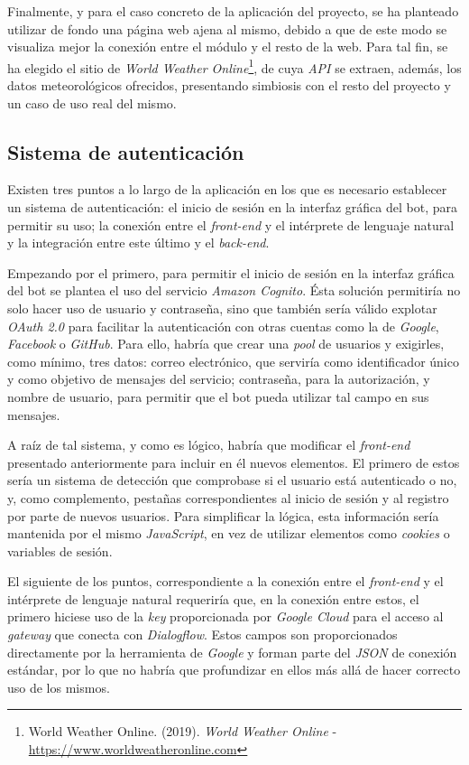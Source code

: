 \documentclass[11pt,spanish,listoffigures]{tfgetsinf}
\begin{document}
Finalmente, y para el caso concreto de la aplicación del proyecto, se ha planteado utilizar de fondo una página web ajena al mismo, debido a que de este modo se visualiza mejor la conexión entre el módulo y el resto de la web. Para tal fin, se ha elegido el sitio de \textit{World Weather Online}\footnote{World Weather Online. (2019). \textit{World Weather Online} - \url{https://www.worldweatheronline.com}}, de cuya \textit{API} se extraen, además, los datos meteorológicos ofrecidos, presentando simbiosis con el resto del proyecto y un caso de uso real del mismo.

\subsection{Sistema de autenticación}
\label{subsec:design-sistema-de-auth}

Existen tres puntos a lo largo de la aplicación en los que es necesario establecer un sistema de autenticación: el inicio de sesión en la interfaz gráfica del bot, para permitir su uso;  la conexión entre el \textit{front-end} y el intérprete de lenguaje natural y la integración entre este último y el \textit{back-end}.

Empezando por el primero, para permitir el inicio de sesión en la interfaz gráfica del bot se plantea el uso del servicio \textit{Amazon Cognito}. Ésta solución permitiría no solo hacer uso de usuario y contraseña, sino que también sería válido explotar \textit{OAuth 2.0} para facilitar la autenticación con otras cuentas como la de \textit{Google}, \textit{Facebook} o \textit{GitHub}. Para ello, habría que crear una \textit{pool} de usuarios y exigirles, como mínimo, tres datos: correo electrónico, que serviría como identificador único y como objetivo de mensajes del servicio; contraseña, para la autorización, y nombre de usuario, para permitir que el bot pueda utilizar tal campo en sus mensajes.

A raíz de tal sistema, y como es lógico, habría que modificar el \textit{front-end} presentado anteriormente para incluir en él nuevos elementos. El primero de estos sería un sistema de detección que comprobase si el usuario está autenticado o no, y, como complemento, pestañas correspondientes al inicio de sesión y al registro por parte de nuevos usuarios. Para simplificar la lógica, esta información sería mantenida por el mismo \textit{JavaScript}, en vez de utilizar elementos como \textit{cookies} o variables de sesión.

El siguiente de los puntos, correspondiente a la conexión entre el \textit{front-end} y el intérprete de lenguaje natural requeriría que, en la conexión entre estos, el primero hiciese uso de la \textit{key} proporcionada por \textit{Google Cloud} para el acceso al \textit{gateway} que conecta con \textit{Dialogflow}. Estos campos son proporcionados directamente por la herramienta de \textit{Google} y forman parte del \textit{JSON} de conexión estándar, por lo que no habría que profundizar en ellos más allá de hacer correcto uso de los mismos.
\end{document}
